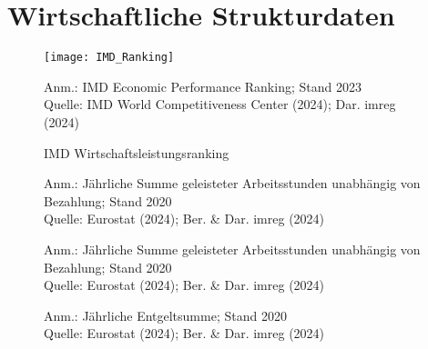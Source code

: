
\section{Wirtschaftliche Strukturdaten}


\setcounter{figure}{1}
\begin{figure}[!h]
	\caption{IMD Wirtschaftsleistungsranking}
	\texttt{[image: IMD\_Ranking]}
	\begin{spacing}{1} \scriptsize
		\vspace{2mm}
		Anm.: IMD Economic Performance Ranking; Stand 2023\\
		Quelle: IMD World Competitiveness Center (2024); Dar. imreg (2024) \end{spacing}
\end{figure}


\begin{figure}[p]
	{\centering {}}
	\label{map:stundengeleistet}
	\begin{spacing}{1} \scriptsize
		Anm.: Jährliche Summe geleisteter Arbeitsstunden unabhängig von Bezahlung; Stand 2020\\
		Quelle: Eurostat (2024); Ber. \& Dar. imreg (2024) \end{spacing}
\end{figure}


\begin{figure}[p]
	{\centering {}}
	\label{map:stundengeleistetprokopf}
	\begin{spacing}{1} \scriptsize
		Anm.: Jährliche Summe geleisteter Arbeitsstunden unabhängig von Bezahlung; Stand 2020\\
		Quelle: Eurostat (2024); Ber. \& Dar. imreg (2024) \end{spacing}
\end{figure}


\begin{figure}[p]
	{\centering {}}
	\label{map:entgelt}
	\begin{spacing}{1} \scriptsize
		Anm.: Jährliche Entgeltsumme; Stand 2020\\
		Quelle: Eurostat (2024); Ber. \& Dar. imreg (2024) \end{spacing}
\end{figure}


